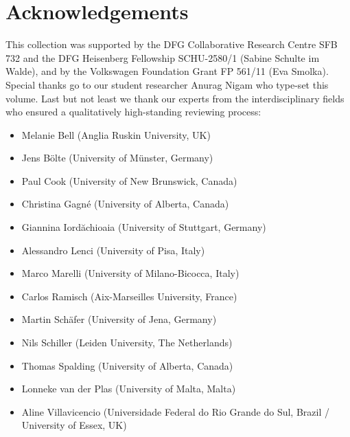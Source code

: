 \documentclass[output=paper]{langsci/langscibook}
\begin{document}
\vspace{+5mm}
\section*{Acknowledgements}

This collection was supported by the DFG Collaborative Research Centre
SFB 732 and the DFG Heisenberg Fellowship SCHU-2580/1 (Sabine Schulte
im Walde), and by the Volkswagen Foundation Grant FP 561/11 (Eva
Smolka). Special thanks go to our student researcher Anurag Nigam who
type-set this volume.
%
Last but not least we thank our experts from the interdisciplinary
fields who ensured a qualitatively high-standing reviewing process:
\begin{itemize}
\item Melanie Bell (Anglia Ruskin University, UK)
\item Jens Bölte (University of Münster, Germany)
\item Paul Cook (University of New Brunswick, Canada)
\item Christina Gagné (University of Alberta, Canada)
\item Giannina Iord\u{a}chioaia (University of Stuttgart, Germany)
\item Alessandro Lenci (University of Pisa, Italy)
\item Marco Marelli (University of Milano-Bicocca, Italy)
\item Carlos Ramisch (Aix-Marseilles University, France)
\item Martin Schäfer (University of Jena, Germany)
\item Nils Schiller (Leiden University, The Netherlands)
\item Thomas Spalding (University of Alberta, Canada)
\item Lonneke van der Plas (University of Malta, Malta)
\item Aline Villavicencio (Universidade Federal do Rio Grande do Sul, Brazil / University of Essex, UK)
\end{itemize}



\vspace{+5mm}
{\sloppy \printbibliography[heading=subbibliography,notkeyword=this]}
\end{document}

